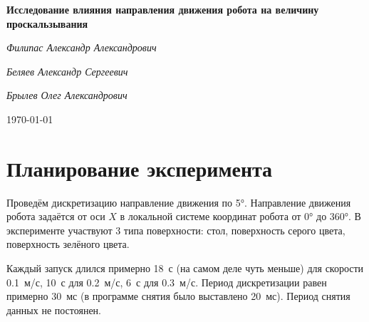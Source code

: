 \documentclass[a4paper,12pt]{article}
\begin{document}
\begin{titlepage}
    \centering
    \vspace*{7cm}
    {\huge \bfseries Исследование влияния направления движения робота на величину проскальзывания \par}
    \vspace{2cm}
    {\Large \itshape Филипас Александр Александрович\par}
    {\Large \itshape Беляев Александр Сергеевич\par}
    {\Large \itshape Брылев Олег Александрович\par}
    \vfill
    \today
\end{titlepage}

\tableofcontents
\newpage

\section{Планирование эксперимента}

Проведём дискретизацию направление движения по \ang{5}.
Направление движения робота задаётся от оси $X$ в локальной системе координат робота от \ang{0} до \ang{360}.
В эксперименте участвуют 3 типа поверхности: стол, поверхность серого цвета, поверхность зелёного цвета.

Каждый запуск длился примерно \qty{18}{с} (на самом деле чуть меньше) для скорости \qty{0.1}{м/с}, \qty{10}{с} для \qty{0.2}{м/с}, \qty{6}{с} для \qty{0.3}{м/с}.
Период дискретизации равен примерно \qty{30}{мс} (в программе снятия было выставлено \qty{20}{мс}). Период снятия данных не постоянен.






\end{document}

